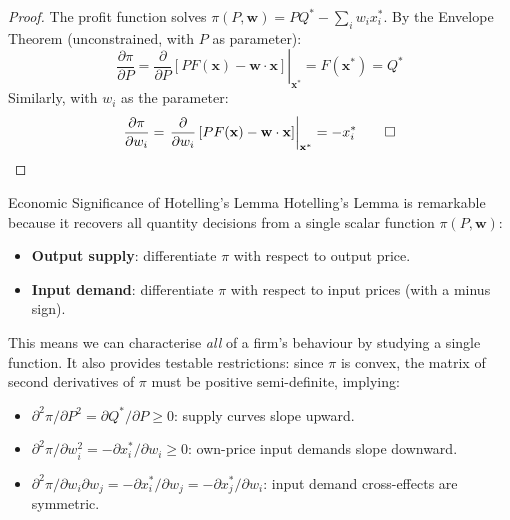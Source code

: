 \documentclass[12pt, a4paper]{article}
\theoremstyle{definition}
\newcommand{\pp}[2]{\dfrac{\partial #1}{\partial #2}}
\begin{document}
\begin{proof}
The profit function solves $\pi(P,\mathbf{w}) = PQ^* - \sum_i w_i x_i^*$.
By the Envelope Theorem (unconstrained, with $P$ as parameter):
\[
  \pp{\pi}{P}
  = \left.\pp{}{P}\left[PF(\mathbf{x}) - \mathbf{w}\cdot\mathbf{x}\right]\right|_{\mathbf{x}^*}
  = F(\mathbf{x}^*) = Q^*
\]
Similarly, with $w_i$ as the parameter:
\[
  \pp{\pi}{w_i}
  = \left.\pp{}{w_i}\left[PF(\mathbf{x}) - \mathbf{w}\cdot\mathbf{x}\right]\right|_{\mathbf{x}^*}
  = -x_i^* \qed
\]
\end{proof}

\begin{keybox}{Economic Significance of Hotelling's Lemma}
Hotelling's Lemma is remarkable because it recovers all quantity decisions
from a single scalar function $\pi(P,\mathbf{w})$:
\begin{itemize}
  \item \textbf{Output supply}: differentiate $\pi$ with respect to
        output price.
  \item \textbf{Input demand}: differentiate $\pi$ with respect to
        input prices (with a minus sign).
\end{itemize}
This means we can characterise \emph{all} of a firm's behaviour by studying
a single function. It also provides testable restrictions: since $\pi$ is
convex, the matrix of second derivatives of $\pi$ must be positive
semi-definite, implying:
\begin{itemize}
  \item $\partial^2\pi/\partial P^2 = \partial Q^*/\partial P \geq 0$:
        supply curves slope upward.
  \item $\partial^2\pi/\partial w_i^2 = -\partial x_i^*/\partial w_i \geq 0$:
        own-price input demands slope downward.
  \item $\partial^2\pi/\partial w_i\partial w_j = -\partial x_i^*/\partial w_j
        = -\partial x_j^*/\partial w_i$: input demand cross-effects are
        symmetric.
\end{itemize}
\end{keybox}
\end{document}
